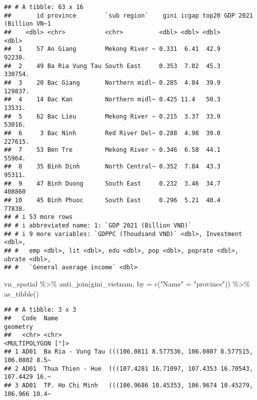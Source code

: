 \documentclass[
]{article}
\newenvironment{Shaded}{\begin{snugshade}}{\end{snugshade}}
\newcommand{\AttributeTok}[1]{\textcolor[rgb]{0.77,0.63,0.00}{#1}}
\newcommand{\FunctionTok}[1]{\textcolor[rgb]{0.00,0.00,0.00}{#1}}
\newcommand{\NormalTok}[1]{#1}
\newcommand{\OtherTok}[1]{\textcolor[rgb]{0.56,0.35,0.01}{#1}}
\newcommand{\SpecialCharTok}[1]{\textcolor[rgb]{0.00,0.00,0.00}{#1}}
\newcommand{\StringTok}[1]{\textcolor[rgb]{0.31,0.60,0.02}{#1}}
\begin{document}
\begin{verbatim}
## # A tibble: 63 x 16
##       id province        `sub region`    gini icgap top20 GDP 2021 (Billion VN~1
##    <dbl> <chr>           <chr>          <dbl> <dbl> <dbl>                  <dbl>
##  1    57 An Giang        Mekong River ~ 0.331  6.41  42.9                 92238.
##  2    49 Ba Ria Vung Tau South East     0.353  7.02  45.3                330754.
##  3    20 Bac Giang       Northern midl~ 0.285  4.84  39.9                129837.
##  4    14 Bac Kan         Northern midl~ 0.425 11.4   50.3                 13531.
##  5    62 Bac Lieu        Mekong River ~ 0.215  3.37  33.9                 53016.
##  6     3 Bac Ninh        Red River Del~ 0.288  4.98  39.0                227615.
##  7    53 Ben Tre         Mekong River ~ 0.346  6.58  44.1                 55964.
##  8    35 Binh Dinh       North Central~ 0.352  7.84  43.3                 95311.
##  9    47 Binh Duong      South East     0.232  3.46  34.7                408860 
## 10    45 Binh Phuoc      South East     0.296  5.21  40.4                 77838.
## # i 53 more rows
## # i abbreviated name: 1: `GDP 2021 (Billion VND)`
## # i 9 more variables: `GDPPC (Thoudsand VND)` <dbl>, Investment <dbl>,
## #   emp <dbl>, lit <dbl>, edu <dbl>, pop <dbl>, poprate <dbl>, ubrate <dbl>,
## #   `General average income` <dbl>
\end{verbatim}

\begin{Shaded}
\begin{Highlighting}[]
\NormalTok{vn\_spatial }\SpecialCharTok{\%\textgreater{}\%} \FunctionTok{anti\_join}\NormalTok{(gini\_vietnam, }\AttributeTok{by =} \FunctionTok{c}\NormalTok{(}\StringTok{"Name"} \OtherTok{=} \StringTok{"province"}\NormalTok{)) }\SpecialCharTok{\%\textgreater{}\%} \FunctionTok{as\_tibble}\NormalTok{()}
\end{Highlighting}
\end{Shaded}

\begin{verbatim}
## # A tibble: 3 x 3
##   Code  Name                                                            geometry
##   <chr> <chr>                                                 <MULTIPOLYGON [°]>
## 1 AD01  Ba Ria - Vung Tau (((106.0811 8.577536, 106.0807 8.577515, 106.0802 8.5~
## 2 AD01  Thua Thien - Hue  (((107.4281 16.71097, 107.4353 16.70543, 107.4429 16.~
## 3 AD01  TP. Ho Chi Minh   (((106.9686 10.45353, 106.9674 10.45279, 106.966 10.4~
\end{verbatim}
\end{document}
